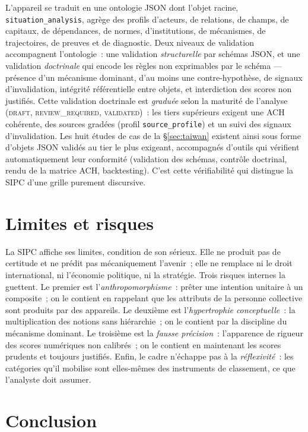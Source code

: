 \documentclass[11pt,a4paper]{article}
\begin{document}
L'appareil se traduit en une ontologie JSON dont l'objet racine, \texttt{situation\_analysis},
agrège des profils d'acteurs, de relations, de champs, de capitaux, de dépendances, de normes,
d'institutions, de mécanismes, de trajectoires, de preuves et de diagnostic. Deux niveaux de
validation accompagnent l'ontologie~: une validation \emph{structurelle} par schémas JSON, et
une validation \emph{doctrinale} qui encode les règles non exprimables par le schéma --- présence
d'un mécanisme dominant, d'au moins une contre-hypothèse, de signaux d'invalidation, intégrité
référentielle entre objets, et interdiction des scores non justifiés. Cette validation
doctrinale est \emph{graduée} selon la maturité de l'analyse (\textsc{draft},
\textsc{review\_required}, \textsc{validated})~: les tiers supérieurs exigent une ACH cohérente,
des sources gradées (profil \texttt{source\_profile}) et un suivi des signaux d'invalidation.
Les huit études de cas de la \S\ref{sec:taiwan} existent ainsi sous forme d'objets JSON
validés au tier le plus exigeant, accompagnés d'outils qui vérifient automatiquement leur
conformité (validation des schémas, contrôle doctrinal, rendu de la matrice ACH, backtesting).
C'est cette vérifiabilité qui distingue la SIPC d'une grille purement discursive.

\section{Limites et risques}

La SIPC affiche ses limites, condition de son sérieux. Elle ne produit pas de certitude et ne
prédit pas mécaniquement l'avenir~; elle ne remplace ni le droit international, ni l'économie
politique, ni la stratégie. Trois risques internes la guettent. Le premier est
l'\emph{anthropomorphisme}~: prêter une intention unitaire à un composite~; on le contient en
rappelant que les attributs de la personne collective sont produits par des appareils. Le
deuxième est l'\emph{hypertrophie conceptuelle}~: la multiplication des notions sans hiérarchie~;
on le contient par la discipline du mécanisme dominant. Le troisième est la \emph{fausse
précision}~: l'apparence de rigueur des scores numériques non calibrés~; on le contient en
maintenant les scores prudents et toujours justifiés. Enfin, le cadre n'échappe pas à la
\emph{réflexivité}~: les catégories qu'il mobilise sont elles-mêmes des instruments de
classement, ce que l'analyste doit assumer.

\section{Conclusion}
\end{document}
